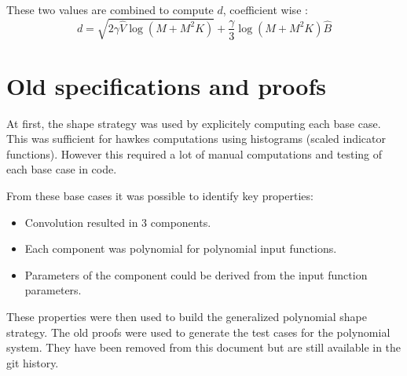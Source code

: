 \documentclass[a4paper,10pt]{article}
\begin{document}
These two values are combined to compute $d$, coefficient wise :
\[
    d =
    \sqrt{2 \gamma \widehat{V} \log(M + M^2 K) } +
    \frac{\gamma}{3} \log(M + M^2 K) \widehat{B}
\]

\section{Old specifications and proofs}

At first, the shape strategy was used by explicitely computing each base case.
This was sufficient for hawkes computations using histograms (scaled indicator functions).
However this required a lot of manual computations and testing of each base case in code.

From these base cases it was possible to identify key properties:
\begin{itemize}
    \item Convolution resulted in 3 components.
    \item Each component was polynomial for polynomial input functions.
    \item Parameters of the component could be derived from the input function parameters.
\end{itemize}

These properties were then used to build the generalized polynomial shape strategy.
The old proofs were used to generate the test cases for the polynomial system.
They have been removed from this document but are still available in the git history.

\end{document}

